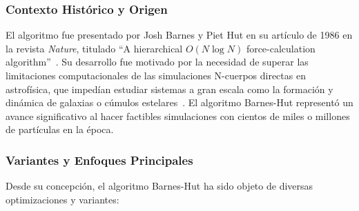 \subsubsection{Contexto Histórico y Origen}

El algoritmo fue presentado por Josh Barnes y Piet Hut en su artículo de 1986 en la revista \textit{Nature}, titulado ``A hierarchical $O(N \log N)$ force-calculation algorithm''~\cite{Barnes1986}. Su desarrollo fue motivado por la necesidad de superar las limitaciones computacionales de las simulaciones N-cuerpos directas en astrofísica, que impedían estudiar sistemas a gran escala como la formación y dinámica de galaxias o cúmulos estelares~\cite{Barnes1986, dubinski1996}. El algoritmo Barnes-Hut representó un avance significativo al hacer factibles simulaciones con cientos de miles o millones de partículas en la época.

\subsubsection{Variantes y Enfoques Principales}

Desde su concepción, el algoritmo Barnes-Hut ha sido objeto de diversas optimizaciones y variantes:

